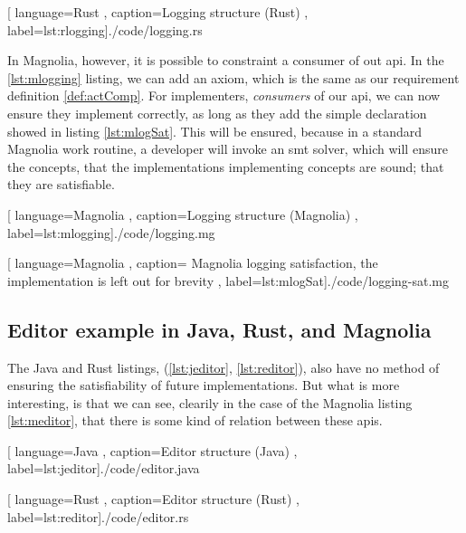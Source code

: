 \begin{center}
  
    [ language=Rust
    , caption={Logging structure (Rust)}
    , label=lst:rlogging]{./code/logging.rs}
\end{center}

In Magnolia, however, it is possible to constraint a consumer of out \gls*{api}.
In the \ref{lst:mlogging} listing, we can add an axiom, which is the same as our
requirement definition \ref{def:actComp}. For implementers, \textit{consumers}
of our \gls*{api}, we can now ensure they implement correctly, as long as they
add the simple declaration showed in listing \ref{lst:mlogSat}. This will be
ensured, because in a standard Magnolia work routine, a developer will invoke an
\gls*{smt} solver, which will ensure the concepts, that the implementations
implementing concepts are sound; that they are satisfiable.

\begin{center}
  
    [ language=Magnolia
    , caption={Logging structure (Magnolia)}
    , label=lst:mlogging]{./code/logging.mg}
\end{center}

\begin{center}
  
    [ language=Magnolia
    , caption={
        Magnolia logging satisfaction, the implementation is left out for
        brevity
      }
    , label=lst:mlogSat]{./code/logging-sat.mg}
\end{center}

\subsection{Editor example in Java, Rust, and Magnolia}

The Java and Rust listings, (\ref{lst:jeditor}, \ref{lst:reditor}), also have no
method of ensuring the satisfiability of future implementations. But what is
more interesting, is that we can see, clearily in the case of the Magnolia
listing \ref{lst:meditor}, that there is some kind of relation between these
\gls*{api}s.

\begin{code}[H]
  
    [ language=Java
    , caption={Editor structure (Java)}
    , label=lst:jeditor]{./code/editor.java}
\end{code}

\begin{code}[H]
  
    [ language=Rust
    , caption={Editor structure (Rust)}
    , label=lst:reditor]{./code/editor.rs}
\end{code}

